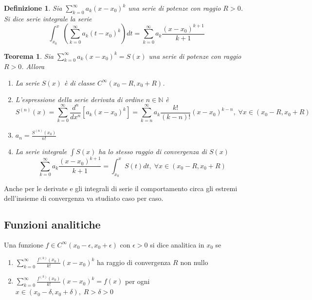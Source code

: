\documentclass{article}
\newtheorem{theorem}{Teorema}
\newtheorem{definition}{Definizione}
\begin{document}
            \vspace{10pt}
            \begin{definition}
                Sia $\sum_{k = 0}^{\infty} a_{k}(x - x_{0})^{k}$ una serie di potenze con raggio $R > 0$.
                Si dice serie integrale la serie
                \[
                    \int_{x_{0}}^{x} \left( \sum_{k = 0}^{\infty} a_{k}(t - x_{0})^{k} \right) dt = \sum_{k = 0}^{\infty} a_{k}\frac{(x - x_{0})^{k + 1}}{k + 1}
                \]
            \end{definition}
        
            \vspace{10pt}
            \begin{theorem}
                Sia $\sum_{k = 0}^{\infty} a_{k}(x - x_{0})^{k} = S(x)$ una serie di potenze con raggio $R > 0$.
                Allora
                \begin{enumerate}[label=(\arabic*)]
                    \item La serie $S(x)$ è di classe $C^{\infty}(x_{0} - R, x_{0} + R)$.
                    \item L'espressione della serie derivata di ordine $n \in \mathbb{N}$ è 
                    \[
                        S^{(n)}(x) = \sum_{k = 0}^{\infty} \frac{d^{n}}{dx^{n}} \left[ a_{k}(x - x_{0})^{k} \right] = \sum_{k = n}^{\infty} a_{k} \frac{k!}{(k-n)!}(x - x_{0})^{k - n} , \; \forall x \in (x_{0} - R, x_{0} + R)
                    \]
                    \item $\displaystyle a_{n} = \frac{S^{(n)}(x_{0})}{n!}$
                    \item La serie integrale $\int S(x)$ ha lo stesso raggio di convergenza di $S(x)$
                    \[
                        \sum_{k = 0}^{\infty} a_{k}\frac{(x - x_{0})^{k + 1}}{k + 1} = \int_{x_{0}}^{x} S(t) dt, \; \forall x \in (x_{0} - R, x_{0} + R)
                    \]
                \end{enumerate}
            \end{theorem}
            Anche per le derivate e gli integrali di serie il comportamento circa gli estremi dell'insieme di convergenza va studiato caso per caso.



        \vspace{10pt}
        \subsection{Funzioni analitiche}
        Una funzione $f \in C^{\infty}(x_{0} - \epsilon, x_{0} + \epsilon)$ con $\epsilon > 0$ si dice analitica in $x_{0}$ se
        \begin{enumerate}[label=(\arabic*)]
            \item $\displaystyle \sum_{k = 0}^{\infty} \frac{f^{(k)}(x_{0})}{k!}(x - x_{0})^{k}$ ha raggio di convergenza $R$ non nullo
            \item $\displaystyle \sum_{k = 0}^{\infty} \frac{f^{(k)}(x_{0})}{k!}(x - x_{0})^{k} = f(x)$ per ogni $x \in (x_{0} - \delta, x_{0} + \delta), \; R > \delta > 0$ 
        \end{enumerate}
\end{document}
